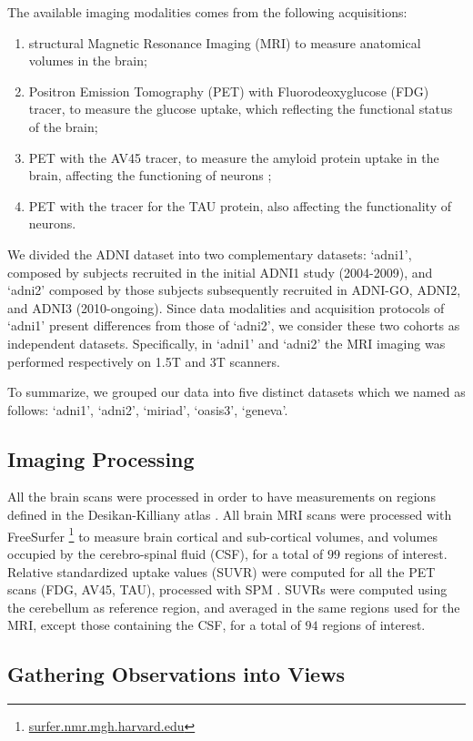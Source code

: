The available imaging modalities comes from the following acquisitions:
%
\begin{enumerate}
\item structural Magnetic Resonance Imaging (MRI) to measure anatomical volumes in the brain;
%
\item Positron Emission Tomography (PET) with Fluorodeoxyglucose (FDG) tracer, to measure the glucose uptake, which reflecting the functional status of the brain;
\item PET with the AV45 tracer, to measure the amyloid protein uptake in the brain, affecting the functioning of neurons ;
\item PET with the tracer for the TAU protein, also affecting the functionality of neurons.
\end{enumerate}
%

We divided the ADNI dataset into two complementary datasets:
`adni1', composed by subjects recruited in the initial ADNI1 study (2004-2009),
and `adni2' composed by those subjects subsequently recruited in ADNI-GO, ADNI2, and ADNI3 (2010-ongoing).
Since data modalities and acquisition protocols of `adni1' present differences from those of `adni2', we consider these two cohorts as independent datasets.
Specifically, in `adni1' and `adni2' the MRI imaging was performed respectively on 1.5T and 3T scanners.

To summarize, we grouped our data into five distinct datasets which we named as follows: `adni1', `adni2', `miriad', `oasis3', `geneva'.

\subsection{Imaging Processing}
All the brain scans were processed in order to have measurements on regions defined in the Desikan-Killiany atlas \citep{Desikan2006}.
All brain MRI scans were processed with FreeSurfer \footnote{\href{https://surfer.nmr.mgh.harvard.edu/}{surfer.nmr.mgh.harvard.edu}} \citep{freesurfer} to measure brain cortical and sub-cortical volumes, and volumes occupied by the cerebro-spinal fluid (CSF), for a total of $99$ regions of interest.
Relative standardized uptake values (SUVR) were computed for all the PET scans (FDG, AV45, TAU), processed with SPM \citep{Ashburner2000}.
SUVRs were computed using the cerebellum as reference region, and averaged in the same regions used for the MRI, except those containing the CSF, for a total of $94$ regions of interest.

\subsection{Gathering Observations into Views}
\label{ssec:views}


